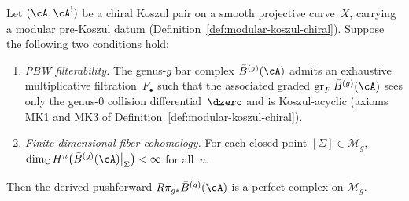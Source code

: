 \begin{lemma}
\label{lem:perfectness-criterion}
Let $(\cA, \cA^!)$ be a chiral Koszul pair on a smooth projective
curve~$X$, carrying a modular pre-Koszul datum
\textup{(}Definition~\textup{\ref{def:modular-koszul-chiral})}.
Suppose the following two conditions hold:
\begin{enumerate}[label=\textup{(\roman*)}]
\item \emph{PBW filterability.}
  The genus-$g$ bar complex $\bar{B}^{(g)}(\cA)$ admits an
  exhaustive multiplicative filtration~$F_\bullet$ such that the
  associated graded $\operatorname{gr}_F \bar{B}^{(g)}(\cA)$
  sees only the genus-$0$ collision differential~$\dzero$ and is
  Koszul-acyclic \textup{(}axioms \textup{MK1} and
  \textup{MK3} of
  Definition~\textup{\ref{def:modular-koszul-chiral})}.

\item \emph{Finite-dimensional fiber cohomology.}
  For each closed point
  $[\Sigma] \in \overline{\mathcal{M}}_g$,
  $\dim_\mathbb{C} H^n\bigl(
  \bar{B}^{(g)}(\cA)\big|_\Sigma\bigr)
  < \infty$ for all~$n$.
\end{enumerate}
Then the derived pushforward
$R\pi_{g*}\bar{B}^{(g)}(\cA)$ is a perfect complex on
$\overline{\mathcal{M}}_g$.
\end{lemma}


